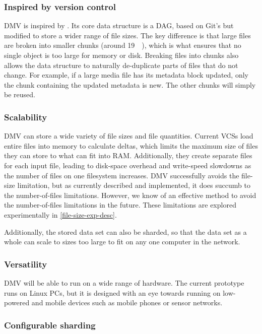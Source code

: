 \subsubsection{Inspired by version control}

\gls{DMV} is inspired by . Its core data structure is a
\gls{DAG}, based on Git's but modified to store a wider range of file sizes. The
key difference is that large files are broken into smaller chunks (around
\SI{19}{\kibi\byte}), which is what ensures that no single object is too large
for memory or disk. Breaking files into chunks also allows the data structure to
naturally de-duplicate parts of files that do not change. For example, if a
large media file has its metadata block updated, only the chunk containing the
updated metadata is new. The other chunks will simply be reused.


\subsubsection{Scalability}

\gls{DMV} can store a wide variety of file sizes and file quantities. Current
\glspl{VCS} load entire files into memory to calculate deltas, which limits the
maximum size of files they can store to what can fit into RAM. Additionally,
they create separate files for each input file, leading to disk-space overhead
and write-speed slowdowns as the number of files on one filesystem increases.
\gls{DMV} successfully avoids the file-size limitation, but as currently
described and implemented, it does succumb to the number-of-files limitations.
However, we know of an effective method to avoid the number-of-files limitations
in the future. These limitations are explored experimentally in
\autoref{file-size-exp-desc}.

Additionally, the stored data set can also be sharded, so that the data set as a
whole can scale to sizes too large to fit on any one computer in the network.


\subsubsection{Versatility}

\gls{DMV} will be able to run on a wide range of hardware. The current prototype
runs on Linux PCs, but it is designed with an eye towards running on low-powered
and mobile devices such as mobile phones or sensor networks.


\subsubsection{Configurable sharding}

